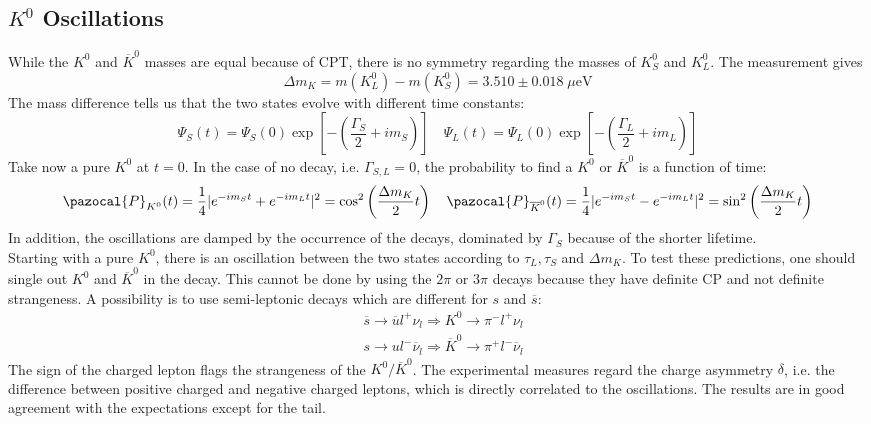 \documentclass[10.75pt,a4paper,openright,bottom=2cm]{article}
\begin{document}
\subsection{$K^0$ Oscillations}
While the $K^0$ and $\overline{K}^0$ masses are equal because of CPT, there is no symmetry regarding the masses of $K_S^0$ and $K_L^0$. The measurement gives
\[
\Delta m_K=m(K_L^0)-m(K_S^0)=3.510\pm0.018\;\text{$\mu$eV}
\]
The mass difference tells us that the two states evolve with different time constants:
\[
\Psi_S(t)=\Psi_S(0)\exp\left[-\left(\frac{\Gamma_S}{2}+im_S\right)\right] \quad \Psi_L(t)=\Psi_L(0)\exp\left[-\left(\frac{\Gamma_L}{2}+im_L\right)\right]
\]
Take now a pure $K^0$ at $t=0$. In the case of no decay, i.e. $\Gamma_{S,L}=0$, the probability to find a $K^0$ or $\overline{K}^0$ is a function of time:
\[
\pazocal{P}_{K^0}(t)=\frac{1}{4}|e^{-im_St}+e^{-im_Lt}|^2=\cos^2\left(\frac{\Delta m_K}{2}t\right) \quad \pazocal{P}_{\overline{K}^0}(t)=\frac{1}{4}|e^{-im_St}-e^{-im_Lt}|^2=\sin^2\left(\frac{\Delta m_K}{2}t\right)
\]
In addition, the oscillations are damped by the occurrence of the decays, dominated by $\Gamma_S$ because of the shorter lifetime.\\
Starting with a pure $K^0$, there is an oscillation between the two states according to $\tau_L, \tau_S$ and $\Delta m_K$. To test these predictions, one should single out $K^0$ and $\overline{K}^0$ in the decay. This cannot be done by using the $2\pi$ or $3\pi$ decays because they have definite CP and not definite strangeness. A possibility is to use semi-leptonic decays which are different for $s$ and $\overline{s}$:
\[
\begin{aligned}
&\overline{s}\to\overline{u}l^+\nu_l\Rightarrow K^0\to\pi^-l^+\nu_l\\
&s\to ul^-\overline{\nu}_l\Rightarrow\overline{K}^0\to\pi^+l^-\overline{\nu}_l
\end{aligned}
\]
The sign of the charged lepton flags the strangeness of the $K^0/\overline{K}^0$. The experimental measures regard the charge asymmetry $\delta$, i.e. the difference between positive charged and negative charged leptons, which is directly correlated to the oscillations. The results are in good agreement with the expectations except for the tail.
\end{document}
